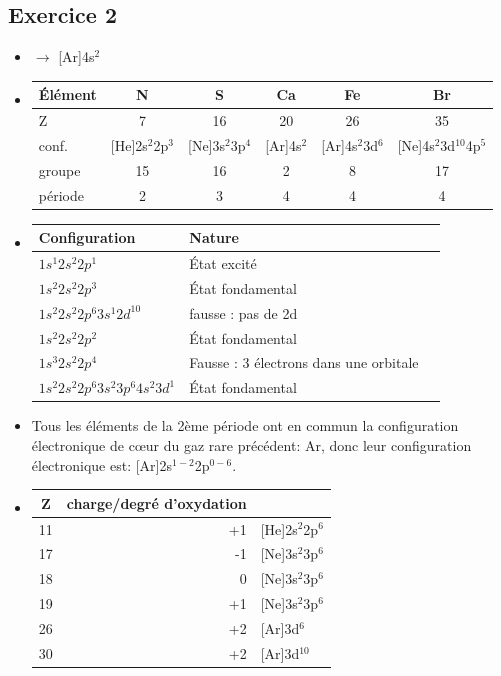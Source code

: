 \documentclass[12pt,french,dvips]{report}
\begin{document}
\subsection{Exercice 2}
\begin{itemize}
\item {} $\rightarrow$ [Ar]4s$^2$
\item %
\begin{tabular}{lccccc}
\hline\hline
Élément & N &  S & Ca & Fe & Br \\
\hline
Z       & 7 & 16 & 20 & 26 & 35 \\
conf.   & [He]2s$^2$2p$^3$ & [Ne]3s$^2$3p$^4$ & [Ar]4s$^2$ & [Ar]4s$^2$3d$^6$ & [Ne]4s$^2$3d$^{10}$4p$^5$ \\
groupe  & 15 & 16 & 2 & 8 & 17 \\
période & 2 & 3 & 4 & 4 & 4 \\
\hline
\end{tabular}
\item
\begin{tabular}{lll}
\hline\hline
Configuration & Nature \\
\hline
$1s^1 2s^2 2p^1$ & État excité \\
$1s^2 2s^2 2p^3$ & État fondamental \\
$1s^2 2s^2 2p^6 3s^1 2d^{10}$ & fausse : pas de 2d        \\
$1s^2 2s^2 2p^2$ & État fondamental \\
$1s^3 2s^2 2p^4$ & Fausse : 3 électrons dans une orbitale \\
$1s^2 2s^2 2p^6 3s^2 3p^6 4s^2 3d^1$  & État fondamental \\
\hline\hline
\end{tabular}
\item Tous les éléments de la 2ème période ont en commun la configuration électronique
de c\oe ur du gaz rare précédent: Ar, donc leur configuration électronique est:
[Ar]2s$^{1-2}$2p$^{0-6}$.

\item %
\begin{tabular}{c|r|l}\hline
Z & charge/degré d'oxydation \\\hline
11 & +1 & [He]2s$^2$2p$^6$ \\\hline
17 & -1 & [Ne]3s$^2$3p$^6$ \\\hline
18 & 0  & [Ne]3s$^2$3p$^6$ \\\hline
19 & +1 & [Ne]3s$^2$3p$^6$ \\\hline
26 & +2 & [Ar]3d$^6$  \\\hline
30 & +2 & [Ar]3d$^{10}$  \\\hline
\end{tabular}
\end{itemize}
\end{document}
